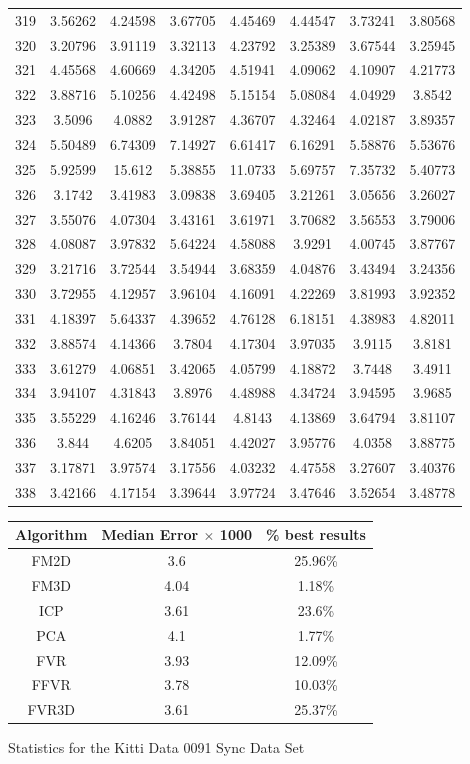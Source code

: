 \begin{figure}
\begin{tabular}{cccccccc}
319 & 3.56262 & 4.24598 & 3.67705 & 4.45469 & 4.44547 & 3.73241 & 3.80568\\
320 & 3.20796 & 3.91119 & 3.32113 & 4.23792 & 3.25389 & 3.67544 & 3.25945\\
321 & 4.45568 & 4.60669 & 4.34205 & 4.51941 & 4.09062 & 4.10907 & 4.21773\\
322 & 3.88716 & 5.10256 & 4.42498 & 5.15154 & 5.08084 & 4.04929 & 3.8542\\
323 & 3.5096 & 4.0882 & 3.91287 & 4.36707 & 4.32464 & 4.02187 & 3.89357\\
324 & 5.50489 & 6.74309 & 7.14927 & 6.61417 & 6.16291 & 5.58876 & 5.53676\\
325 & 5.92599 & 15.612 & 5.38855 & 11.0733 & 5.69757 & 7.35732 & 5.40773\\
326 & 3.1742 & 3.41983 & 3.09838 & 3.69405 & 3.21261 & 3.05656 & 3.26027\\
327 & 3.55076 & 4.07304 & 3.43161 & 3.61971 & 3.70682 & 3.56553 & 3.79006\\
328 & 4.08087 & 3.97832 & 5.64224 & 4.58088 & 3.9291 & 4.00745 & 3.87767\\
329 & 3.21716 & 3.72544 & 3.54944 & 3.68359 & 4.04876 & 3.43494 & 3.24356\\
330 & 3.72955 & 4.12957 & 3.96104 & 4.16091 & 4.22269 & 3.81993 & 3.92352\\
331 & 4.18397 & 5.64337 & 4.39652 & 4.76128 & 6.18151 & 4.38983 & 4.82011\\
332 & 3.88574 & 4.14366 & 3.7804 & 4.17304 & 3.97035 & 3.9115 & 3.8181\\
333 & 3.61279 & 4.06851 & 3.42065 & 4.05799 & 4.18872 & 3.7448 & 3.4911\\
334 & 3.94107 & 4.31843 & 3.8976 & 4.48988 & 4.34724 & 3.94595 & 3.9685\\
335 & 3.55229 & 4.16246 & 3.76144 & 4.8143 & 4.13869 & 3.64794 & 3.81107\\
336 & 3.844 & 4.6205 & 3.84051 & 4.42027 & 3.95776 & 4.0358 & 3.88775\\
337 & 3.17871 & 3.97574 & 3.17556 & 4.03232 & 4.47558 & 3.27607 & 3.40376\\
338 & 3.42166 & 4.17154 & 3.39644 & 3.97724 & 3.47646 & 3.52654 & 3.48778\\
\end{tabular}
\vspace{10mm}
\centering
\begin{tabular}{ccc}
\hline
\textbf{Algorithm} & \textbf{Median Error $\times$ 1000} & \textbf{\% best results}\\ \hline
FM2D	& 3.6 & 25.96\%\\
FM3D	& 4.04 & 1.18\%\\
ICP	& 3.61 & 23.6\%\\
PCA	& 4.1 & 1.77\%\\
FVR	& 3.93 & 12.09\%\\
FFVR	& 3.78 & 10.03\%\\
FVR3D	& 3.61 & 25.37\%\\
\end{tabular}
\caption{Statistics for the Kitti Data 0091 Sync Data Set}
\label{tab:kittidata0091sync}
\end{figure} 


